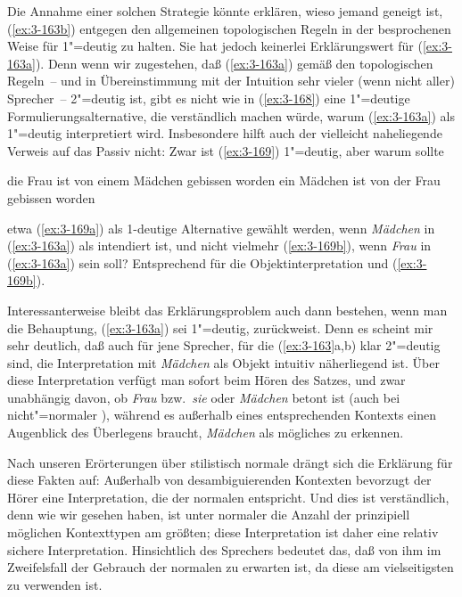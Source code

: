 \documentclass[output=paper]{langsci/langscibook}
\begin{document}
Die Annahme einer solchen Strategie könnte erklären, wieso jemand
geneigt ist, (\ref{ex:3-163b}) entgegen den allgemeinen topologischen Regeln in
der besprochenen Weise für 1"=deutig zu halten. Sie hat jedoch
keinerlei Erklärungswert für (\ref{ex:3-163a}). Denn wenn wir zugestehen, daß
(\ref{ex:3-163a}) gemäß den topologischen Regeln~-- und in Übereinstimmung mit
der Intuition sehr vieler (wenn nicht aller) Sprecher~-- 2"=deutig ist,
gibt es nicht wie in (\ref{ex:3-168}) eine 1"=deutige Formulierungsalternative,
die verständlich machen würde, warum (\ref{ex:3-163a}) als 1"=deutig
interpretiert wird. Insbesondere hilft auch der vielleicht
naheliegende Verweis auf das Passiv nicht: Zwar ist (\ref{ex:3-169}) 1"=deutig,
aber warum sollte
\begin{exe}
\ex
\label{ex:3-169}
\begin{xlist}
\ex
\label{ex:3-169a}
die Frau ist von einem Mädchen gebissen worden
\ex
\label{ex:3-169b}
ein Mädchen ist von der Frau gebissen worden
\end{xlist}
\end{exe}
etwa (\ref{ex:3-169a}) als 1-deutige Alternative gewählt werden, wenn \textit{Mädchen} in
(\ref{ex:3-163a}) als  intendiert ist, und nicht vielmehr (\ref{ex:3-169b}), wenn
\textit{Frau} in (\ref{ex:3-163a})  sein soll? Entsprechend für die Objektinterpretation und (\ref{ex:3-169b}).

Interessanterweise bleibt das Erklärungsproblem auch dann bestehen,
wenn man die Behauptung, (\ref{ex:3-163a}) sei 1"=deutig, zurückweist. Denn es
scheint mir sehr deutlich, daß auch für jene Sprecher, für die (\ref{ex:3-163}a,b) klar 2"=deutig sind, die Interpretation mit \textit{Mädchen} als Objekt
intuitiv näherliegend ist. Über diese Interpretation verfügt man
sofort beim Hören des Satzes, und zwar unabhängig davon, ob \textit{Frau}
bzw.\ \textit{sie} oder \textit{Mädchen} betont ist (\dash auch bei nicht"=normaler
), während es außerhalb eines entsprechenden Kontexts einen
Augenblick des Überlegens braucht, \textit{Mädchen} als mögliches  zu
erkennen.

Nach unseren Erörterungen über stilistisch normale  drängt
sich die Erklärung für diese Fakten auf: Außerhalb von
desambiguierenden Kontexten bevorzugt der Hörer eine Interpretation,
die der normalen  entspricht. Und dies ist verständlich,
denn wie wir gesehen haben, ist unter normaler  die Anzahl
der prinzipiell möglichen Kontexttypen am größten; diese
Interpretation ist daher eine relativ sichere Interpretation. Hinsichtlich des Sprechers bedeutet das, daß von ihm im Zweifelsfall der Gebrauch der normalen  zu erwarten
ist, da diese  am vielseitigsten zu verwenden ist.
\end{document}

